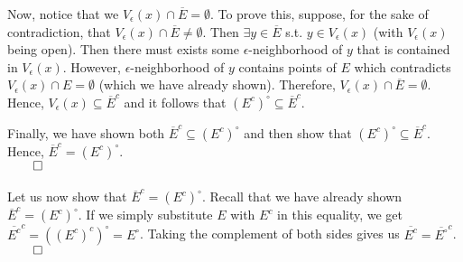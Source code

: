 \documentclass[11pt]{article}
\begin{document}
\begin{itemize}
\begin{itemize}
                Now, notice that we $V_\epsilon(x) \cap \overline{E} =
                \emptyset$. To prove this, suppose, for the sake of
                contradiction, that $V_\epsilon(x) \cap \overline{E} \neq
                \emptyset$. Then $\exists y \in \overline{E}$ s.t. $y \in
                V_\epsilon(x)$ (with $V_\epsilon(x)$ being open). Then there
                must exists some $\epsilon$-neighborhood of $y$ that is
                contained in $V_\epsilon(x)$. However, $\epsilon$-neighborhood
                of $y$ contains points of $E$ which contradicts $V_\epsilon(x)
                \cap E = \emptyset$ (which we have already shown). Therefore,
                $V_\epsilon(x) \cap \overline{E} = \emptyset$. Hence,
                $V_\epsilon(x) \subseteq \overline{E}^c$ and it follows that
                $(E^c)^\circ \subseteq \overline{E}^c$.

                Finally, we have shown both $\overline{E}^c \subseteq
                (E^c)^\circ$ and then show that $(E^c)^\circ \subseteq
                \overline{E}^c$. Hence, $\overline{E}^c = (E^c)^\circ$.\\
                $\qed$
                \\
                \\
                Let us now show that $\overline{E}^c = (E^c)^\circ$. Recall
                that we have already shown $\overline{E}^c = (E^c)^\circ$.  If
                we simply substitute $E$ with $E^c$ in this equality, we get
                $\overline{E^c}^c = ((E^c)^c)^\circ = E^\circ$. Taking the
                complement of both sides gives us $\overline{E^c} =
                \overline{E^\circ}^c$.\\
                $\qed$
        \end{itemize}
\end{itemize}

\end{document}
